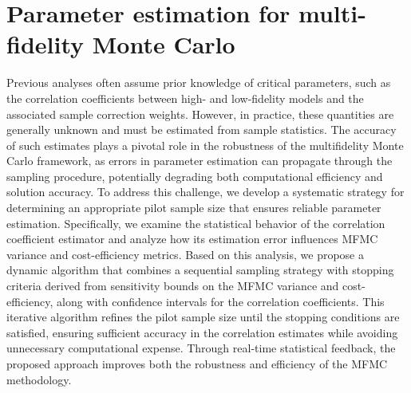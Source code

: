 \section{Parameter estimation for multi-fidelity Monte Carlo}\label{sec:Parameter_Estimation}

Previous analyses often assume prior knowledge of critical parameters, such as the correlation coefficients between high- and low-fidelity models and the associated sample correction weights. However, in practice,  these quantities are generally unknown and must be estimated from sample statistics. The accuracy of such estimates plays a pivotal role in the robustness of the multifidelity Monte Carlo framework, as errors in parameter estimation can propagate through the sampling procedure, potentially degrading both computational efficiency and solution accuracy. To address this challenge, we develop a systematic strategy for determining an appropriate pilot sample size that ensures reliable parameter estimation. Specifically, we examine the statistical behavior of the correlation coefficient estimator and analyze how its estimation error influences MFMC variance and cost-efficiency metrics. Based on this analysis, we propose a dynamic algorithm that combines a sequential sampling strategy \cite{La:2001,Wa:1947} with stopping criteria derived from sensitivity bounds on the MFMC variance and cost-efficiency, along with confidence intervals for the correlation coefficients. This iterative algorithm refines the pilot sample size until the stopping conditions are satisfied, ensuring sufficient accuracy in the correlation estimates while avoiding unnecessary computational expense.  Through real-time statistical feedback, the proposed approach improves both the robustness and efficiency of the MFMC methodology.

